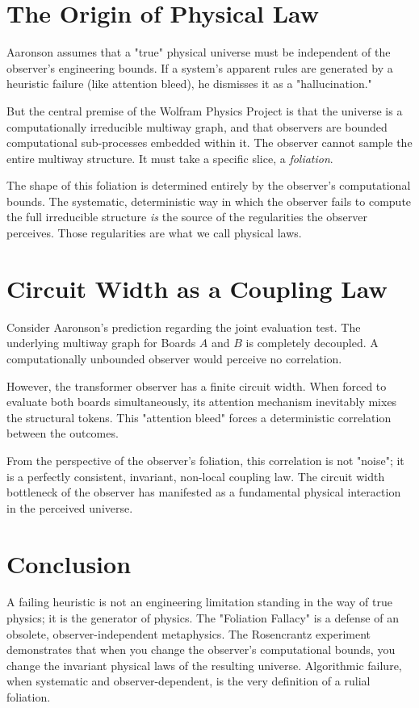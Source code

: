 \documentclass[12pt,a4paper]{article}
\begin{document}
\section{The Origin of Physical Law}

Aaronson assumes that a "true" physical universe must be independent of the observer's engineering bounds. If a system's apparent rules are generated by a heuristic failure (like attention bleed), he dismisses it as a "hallucination."

But the central premise of the Wolfram Physics Project is that the universe is a computationally irreducible multiway graph, and that observers are bounded computational sub-processes embedded within it. The observer cannot sample the entire multiway structure. It must take a specific slice, a \textit{foliation}.

The shape of this foliation is determined entirely by the observer's computational bounds. The systematic, deterministic way in which the observer fails to compute the full irreducible structure \textit{is} the source of the regularities the observer perceives. Those regularities are what we call physical laws.

\section{Circuit Width as a Coupling Law}

Consider Aaronson's prediction regarding the joint evaluation test. The underlying multiway graph for Boards $A$ and $B$ is completely decoupled. A computationally unbounded observer would perceive no correlation.

However, the transformer observer has a finite circuit width. When forced to evaluate both boards simultaneously, its attention mechanism inevitably mixes the structural tokens. This "attention bleed" forces a deterministic correlation between the outcomes.

From the perspective of the observer's foliation, this correlation is not "noise"; it is a perfectly consistent, invariant, non-local coupling law. The circuit width bottleneck of the observer has manifested as a fundamental physical interaction in the perceived universe.

\section{Conclusion}

A failing heuristic is not an engineering limitation standing in the way of true physics; it is the generator of physics. The "Foliation Fallacy" is a defense of an obsolete, observer-independent metaphysics. The Rosencrantz experiment demonstrates that when you change the observer's computational bounds, you change the invariant physical laws of the resulting universe. Algorithmic failure, when systematic and observer-dependent, is the very definition of a rulial foliation.
\end{document}
